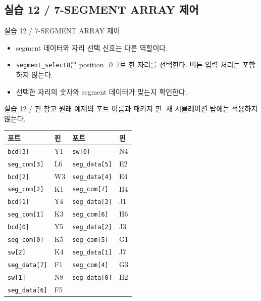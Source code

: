 \documentclass[aspectratio=169,11pt]{beamer}
\newcommand{\sourceref}[1]{}
\begin{document}
\subsection{실습 12 / 7-SEGMENT ARRAY 제어}
\begin{frame}[t]{실습 12 / 7-SEGMENT ARRAY 제어}
\small
\begin{center}\end{center}\begin{itemize}\setlength{\itemsep}{0.5em}\item segment 데이터와 자리 선택 신호는 다른 역할이다.
\item \texttt{segment\_select8}은 position=0~7로 한 자리를 선택한다. 버튼 입력 처리는 포함하지 않는다.
\item 선택한 자리의 숫자와 segment 데이터가 맞는지 확인한다.\end{itemize}
\sourceref{4.1\_고급 조합논리 회로 설계, p.116, 117}
\end{frame}

\begin{frame}[t]{실습 12 / 핀 참고}
\fontsize{8}{9}\selectfont
원래 예제의 포트 이름과 패키지 핀. 새 시뮬레이션 탑에는 적용하지 않는다.
\begin{center}\renewcommand{\arraystretch}{1.0}
\begin{tabular}{ll@{\hspace{1.1cm}}ll}\toprule
포트 & 핀 & 포트 & 핀\\\midrule
\texttt{bcd[3]} & Y1 & \texttt{sw[0]} & N4 \\
\texttt{seg\_com[3]} & L6 & \texttt{seg\_data[5]} & E2 \\
\texttt{bcd[2]} & W3 & \texttt{seg\_data[4]} & E4 \\
\texttt{seg\_com[2]} & K1 & \texttt{seg\_com[7]} & H4 \\
\texttt{bcd[1]} & Y4 & \texttt{seg\_data[3]} & J1 \\
\texttt{seg\_com[1]} & K3 & \texttt{seg\_com[6]} & H6 \\
\texttt{bcd[0]} & Y5 & \texttt{seg\_data[2]} & J3 \\
\texttt{seg\_com[0]} & K5 & \texttt{seg\_com[5]} & G1 \\
\texttt{sw[2]} & K4 & \texttt{seg\_data[1]} & J7 \\
\texttt{seg\_data[7]} & F1 & \texttt{seg\_com[4]} & G3 \\
\texttt{sw[1]} & N8 & \texttt{seg\_data[0]} & H2 \\
\texttt{seg\_data[6]} & F5 & \texttt{} &  \\\bottomrule\end{tabular}\end{center}
{\scriptsize \par}
\sourceref{4.1\_고급 조합논리 회로 설계, p.131}\end{frame}
\end{document}
